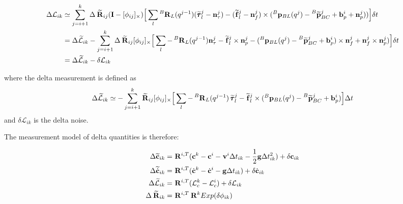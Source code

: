 \documentclass[11pt]{article}
\newcommand{\Rot}[2]{\prescript{#1}{}{\bfR}_{#2}}
\newcommand{\Rotm}[2]{\prescript{#1}{}{\widetilde{\bfR}}_{#2}}
\newcommand{\noise}{\bfn}
\newcommand{\bias}{\bfb}
\newcommand{\posi}[2]{\prescript{#1}{}{\bfp}_{#2}}
\newcommand{\posim}[2]{\prescript{#1}{}{\widetilde{\bfp}}_{#2}}
\newcommand{\vel}[2]{\prescript{#1}{}{\bfv}_{#2}}
\newcommand{\forcem}[2]{\prescript{#1}{}{\widetilde{\bff}}_{#2}}
\newcommand{\torquem}[2]{\prescript{#1}{}{\widetilde{\pmb{\tau}}}_{#2}}
\newcommand{\AM}{\mathcal{L}}
\newcommand{\AMm}{\widetilde{\mathcal{L}}}
\newcommand{\COM}{\bfc}
\newcommand{\COMm}{\widetilde{\bfc}}
\newcommand{\COMd}{\dot{\bfc}}
\newcommand{\COMdm}{\widetilde{\dot{\bfc}}}
\newcommand{\grav}{\bfg}
\newcommand{\Ident}{\bfI}
\begin{document}
\begin{equation}
\begin{split}
\Delta \AM_{ik} &\simeq
\sum_{j=i+1}^{k} \Delta \Rotm{}{ij}(\Ident - [\phi_{ij}]_{\times}) \Big[ 
\sum_l \Rot{B}{L}(q^{j-1}) (\torquem{}{l}^{j} - \noise_{\tau}^{j}) - (\forcem{}{l}^{j} - \noise_f^{j}) \times (\posi{B}{BL}(q^j) - \posim{B}{BC}^j + \bias_{p}^i + \noise_p^j)) \Big]  \delta t
\\
&= \Delta \AMm_{ik} -\sum_{j=i+1}^{k} \Delta \Rotm{}{ij}[\phi_{ij}]_{\times} \Big[ 
\sum_l - \Rot{B}{L}(q^{j-1}) \noise_{\tau}^{j} - %
\forcem{}{l}^{j} \times \noise_p^j - (\posi{B}{BL}(q^j) - \posim{B}{BC}^j + \bias_{p}^i) \times \noise_f^{j} + \noise_f^{j} \times \noise_p^j) \Big]  \delta t
\\
&= \Delta \AMm_{ik} - \delta \AM_{ik}
\end{split}
\end{equation}

where the delta measurement is defined as 
\begin{equation}
    \Delta \AMm_{ik} \simeq -\sum_{j=i+1}^{k} \Rotm{}{ij}[\phi_{ij}]_{\times} \Big[ 
    \sum_l -\Rot{B}{L}(q^{j-1}) \torquem{}{l}^{j} - \forcem{}{l}^{j} \times (\posi{B}{BL}(q^j) - \posim{B}{BC}^j + \bias_{p}^i) \Big]  \Delta t
\end{equation}
and $\delta \AM_{ik}$ is the delta noise. 

The measurement model of delta quantities is therefore:

\begin{equation}
\begin{split}
\Delta \COMm_{ik}  &= \Rot{}{}^{i,T} (\COM^k - \COM^i - \vel{}{}^i \Delta t_{ik} - \frac{1}{2}\grav \Delta t_{ik}^2) + \delta \COM_{ik} 
\\
\Delta \COMdm_{ik} &= \Rot{}{}^{i,T} (\COMd^{k} - \COMd^{i} - \bfg \Delta t_{ik}) + \delta \COMd_{ik}
\\
\Delta \AMm_{ik}   &= \Rot{}{}^{i,T} (\AM_c^{k} - \AM_c^{i}) + \delta \AM_{ik}
\\
\Delta \Rotm{}{ik} &= \Rot{}{}^{i,T} \Rot{}{}^{k} Exp(\delta \phi_{ik})
\end{split}
\end{equation}
\end{document}
